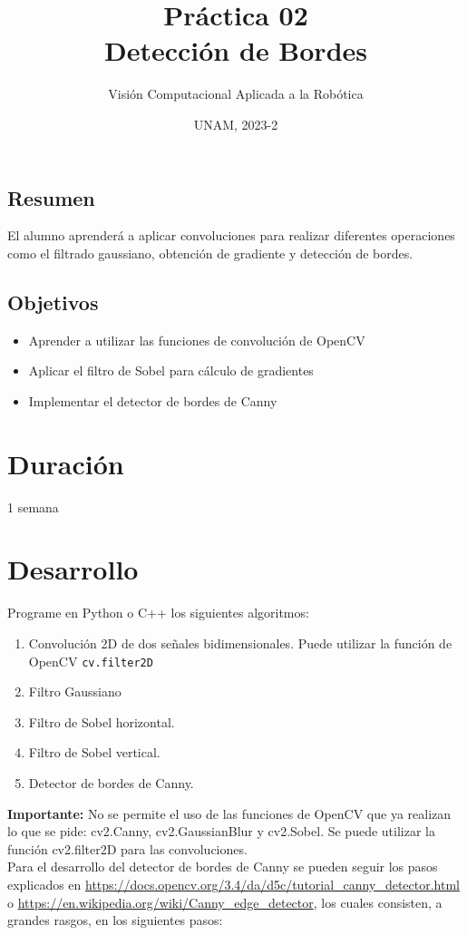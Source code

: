 \documentclass[letterpaper,11pt]{article}
\title{Práctica 02\\Detección de Bordes}
\author{Visión Computacional Aplicada a la Robótica}
\date{UNAM, 2023-2}
\begin{document}
\renewcommand{\tablename}{Tabla}

\maketitle

\subsection*{Resumen}
El alumno aprenderá a aplicar convoluciones para realizar diferentes operaciones como el filtrado gaussiano, obtención de gradiente y detección de bordes. 


\subsection*{Objetivos}
\begin{itemize}
\item Aprender a utilizar las funciones de convolución de OpenCV
\item Aplicar el filtro de Sobel para cálculo de gradientes
\item Implementar el detector de bordes de Canny
\end{itemize}

\section*{Duración}
1 semana

\section*{Desarrollo}
Programe en Python o C++ los siguientes algoritmos:

\begin{enumerate}
\item Convolución 2D de dos señales bidimensionales. Puede utilizar la función de OpenCV \texttt{cv.filter2D}
\item Filtro Gaussiano
\item Filtro de Sobel horizontal.
\item Filtro de Sobel vertical.
\item Detector de bordes de Canny.
\end{enumerate}

\textbf{Importante:} No se permite el uso de las funciones de OpenCV que ya realizan lo que se pide: cv2.Canny, cv2.GaussianBlur y cv2.Sobel. Se puede utilizar la función cv2.filter2D para las convoluciones. 
\[\]
Para el desarrollo del detector de bordes de Canny se pueden seguir los pasos explicados en \url{https://docs.opencv.org/3.4/da/d5c/tutorial_canny_detector.html} o \url{https://en.wikipedia.org/wiki/Canny_edge_detector}, los cuales consisten, a grandes rasgos, en los siguientes pasos:
\end{document}
